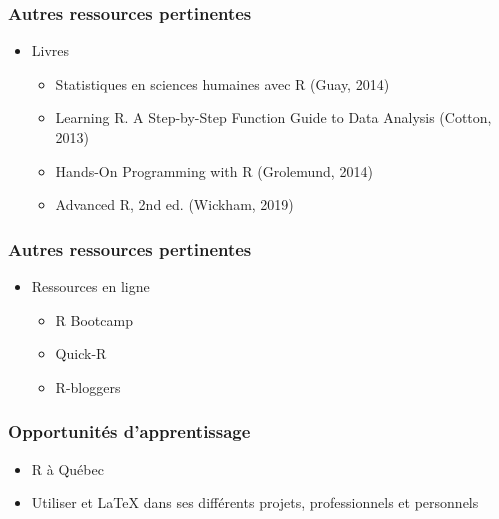 \documentclass{beamer}
\begin{document}

    \begin{frame}
    
      \frametitle{Autres ressources pertinentes} \vspace{1cm}
      
       \begin{itemize}
        \item Livres
        
          \begin{itemize}
            \item Statistiques en sciences humaines avec R (Guay, 2014)
            \item Learning R. A Step-by-Step Function Guide to Data Analysis (Cotton, 2013)
            \item Hands-On Programming with R (Grolemund, 2014)
            \item Advanced R, 2nd ed. (Wickham, 2019)

        \end{itemize}
      \end{itemize}
      
     \end{frame}


    \begin{frame}
    
      \frametitle{Autres ressources pertinentes} \vspace{1cm}
      
       \begin{itemize}
       \item Ressources en ligne
       
        \begin{itemize}
          \item R Bootcamp
          \item Quick-R
          \item R-bloggers
            
        \end{itemize}
      \end{itemize}
      
     \end{frame}
     


   \begin{frame}
    
      \frametitle{Opportunités d'apprentissage} \vspace{1cm}

        \begin{itemize}
          \item R à Québec
          \item Utiliser \R et \LaTeX{} dans ses différents projets, professionnels et personnels
            
        \end{itemize}

     \end{frame}
\end{document}
